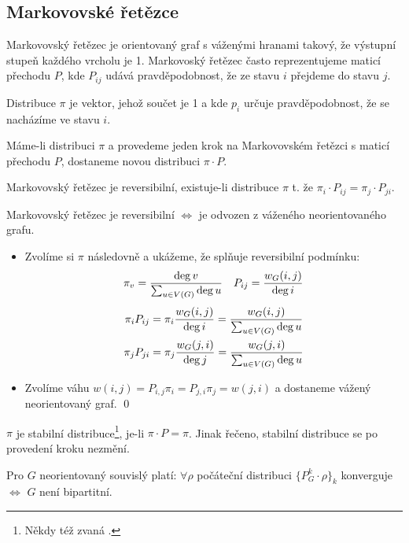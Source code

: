 \subsection{Markovovské řetězce}


\df Markovovský řetězec je orientovaný graf s váženými hranami takový, že
výstupní stupeň každého vrcholu je 1. Markovoský řetězec často reprezentujeme
maticí přechodu $P$, kde $P_{ij}$ udává pravděpodobnost, že ze stavu $i$
přejdeme do stavu $j$.

\df Distribuce $\pi$ je vektor, jehož součet je 1 a kde $p_i$ určuje
pravděpodobnost, že se nacházíme ve stavu $i$.

\pzn Máme-li distribuci $\pi$ a provedeme jeden krok na Markovovském řetězci s
maticí přechodu $P$, dostaneme novou distribuci $\pi\cdot P$.

\df Markovovský řetězec je reversibilní, existuje-li distribuce $\pi$
t. že $\pi_i\cdot P_{ij} = \pi_j\cdot P_{ji}$.

\lm Markovovský řetězec je reversibilní $\Leftrightarrow$ je odvozen z váženého neorientovaného grafu.

\dk 
\begin{itemize}

\item[\uv{$\Leftarrow$}]
Zvolíme si $\pi$ následovně a ukážeme, že splňuje reversibilní podmínku:
\begin{align*}
& \pi_v = {\deg v\over \sum_{u\in V(G)} \deg u} & P_{ij} = {w_G(i,j)\over \deg i} \\ 
\end{align*}
\begin{align*}
\pi_i P_{ij} &= \pi_i {w_G(i,j)\over \deg i} = {w_G(i,j)\over \sum_{u\in V(G)}\deg u} \\
\pi_j P_{ji} &= \pi_j {w_G(j,i)\over \deg j} = {w_G(j,i)\over \sum_{u\in V(G)}\deg u}
\end{align*}

\item[\uv{$\Rightarrow$}]
Zvolíme váhu $w(i,j) = P_{i,j}\pi_i = P_{j,i}\pi_j = w(j,i)$ a dostaneme vážený
neorientovaný graf.
\qed
\end{itemize}

\df $\pi$ je stabilní distribuce\footnote{Někdy též zvaná .},
je-li $\pi\cdot P = \pi$. Jinak řečeno, stabilní distribuce se po provedení
kroku nezmění.

\vt Pro $G$ neorientovaný souvislý platí: $\forall \rho$ počáteční distribuci $\{P_G^k\cdot \rho\}_k$ konverguje $\Leftrightarrow$ $G$ není bipartitní.

